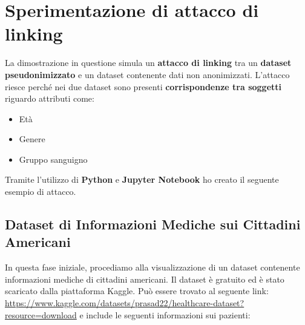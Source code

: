 

\chapter{Sperimentazione di attacco di linking}

La dimostrazione in questione simula un \textbf{attacco di linking} tra un \textbf{dataset pseudonimizzato} e un dataset contenente dati non anonimizzati. L'attacco riesce perché nei due dataset sono presenti \textbf{corrispondenze tra soggetti} riguardo attributi come:

\begin{itemize}
  \item Età
  \item Genere
  \item Gruppo sanguigno
\end{itemize}

Tramite l'utilizzo di \textbf{Python} e \textbf{Jupyter Notebook} ho creato il seguente esempio di attacco.

\newpage

\section{Dataset di Informazioni Mediche sui Cittadini Americani}

In questa fase iniziale, procediamo alla visualizzazione di un dataset contenente informazioni mediche di cittadini americani. Il dataset è gratuito ed è stato scaricato dalla piattaforma Kaggle. Può essere trovato al seguente link: \href{https://www.kaggle.com/datasets/prasad22/healthcare-dataset?resource=download}{https://www.kaggle.com/datasets/prasad22/healthcare-dataset?resource=download} e include le seguenti informazioni sui pazienti:

